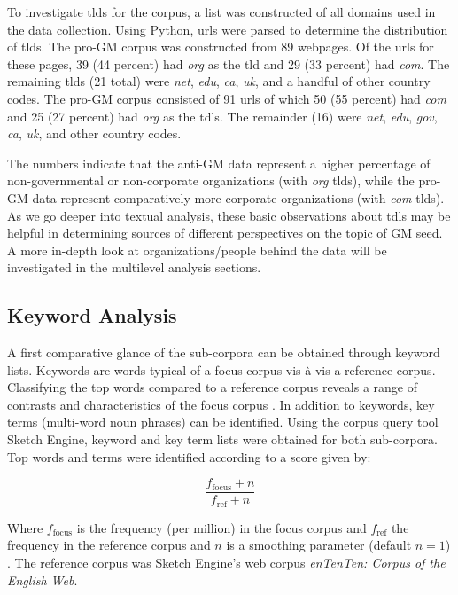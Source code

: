To investigate tlds for the corpus, a list was constructed of all domains used in the data collection. Using Python, urls were parsed to determine the distribution of tlds. The pro-GM corpus was constructed from 89 webpages. Of the urls for these pages, 39 (44 percent) had \textit{org} as the tld and 29 (33 percent) had \textit{com}. The remaining tlds (21 total) were \textit{net}, \textit{edu}, \textit{ca}, \textit{uk}, and a handful of other country codes. The pro-GM corpus consisted of 91 urls of which 50 (55 percent) had \textit{com} and 25 (27 percent) had \textit{org} as the tdls. The remainder (16) were \textit{net}, \textit{edu}, \textit{gov}, \textit{ca}, \textit{uk}, and other country codes.

The numbers indicate that the anti-GM data represent a higher percentage of non-governmental or non-corporate organizations (with \textit{org} tlds), while the pro-GM data represent comparatively more corporate organizations (with \textit{com} tlds). As we go deeper into textual analysis, these basic observations about tdls may be helpful in determining sources of different perspectives on the topic of GM seed. A more in-depth look at organizations/people behind the data will be investigated in the multilevel analysis sections. 

\subsection{Keyword Analysis}

A first comparative glance of the sub-corpora can be obtained through keyword lists. Keywords are words typical of a focus corpus vis-\`a-vis a reference corpus. Classifying the top words compared to a reference corpus reveals a range of contrasts and characteristics of the focus corpus \citep{Kilgarriff2012a}. In addition to keywords, key terms (multi-word noun phrases) can be identified. Using the corpus query tool Sketch Engine, keyword and key term lists were obtained for both sub-corpora. Top words and terms were identified according to a score given by: 

\[ \frac{f_\mathrm{focus}+n}{f_\mathrm{ref}+n} \]

Where \(f_\mathrm{focus}\) is the frequency (per million) in the focus corpus and \(f_\mathrm{ref}\) the frequency in the reference corpus and \(n\) is a smoothing parameter (default \(n=1\)) \citep{Kilgarriff2014a}. The reference corpus was Sketch Engine's web corpus \textit{enTenTen: Corpus of the English Web}.	 

